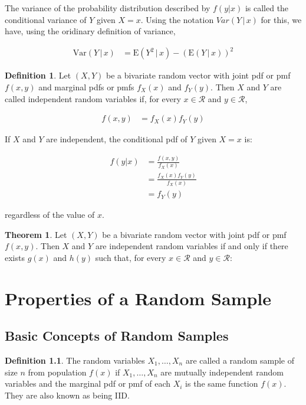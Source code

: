 \documentclass[11pt,a4paper]{report}
\theoremstyle{definition}
\newtheorem{defn}{Definition}[section]
\theoremstyle{theorem}
\newtheorem{thm}{Theorem}[section]
\theoremstyle{example}
\begin{document}
The variance of the probability distribution described by $f(y|x)$ is called the conditional variance of $Y$ given $X = x$.  Using the notation $Var(Y \, | \, x)$ for this, we have, using the oridinary definition of variance,

\begin{align*}
  \mathrm{Var}(Y \, | \, x) &= \mathrm{E}(Y^2 \, | \, x) - (\mathrm{E}(Y \, | \, x))^2
\end{align*}

\begin{defn}
  Let $(X, Y)$ be a bivariate random vector with joint pdf or pmf $f(x,y)$ and marginal pdfs or pmfs $f_X(x)$ and $f_Y(y)$.  Then $X$ and $Y$ are called independent random variables if, for every $x \in \mathcal{R}$ and $y \in \mathcal{R}$,

  \begin{align*}
    f(x,y) &= f_X(x) f_Y(y)
  \end{align*}

  If $X$ and $Y$ are independent, the conditional pdf of $Y$ given $X = x$ is:

  \begin{align*}
    f(y|x) &= \frac{f(x,y)}{f_X(x)} \\
    &= \frac{f_X(x) f_Y(y)}{f_X(x)} \\
    &= f_Y(y)
  \end{align*}

  regardless of the value of $x$.
\end{defn}

\begin{thm}
  Let $(X,Y)$ be a bivariate random vector with joint pdf or pmf $f(x,y)$.  Then $X$ and $Y$ are independent random variables if and only if there exists $g(x)$ and $h(y)$ such that, for every $x \in \mathcal{R}$ and $y \in \mathcal{R}$:
\end{thm}

\chapter{Properties of a Random Sample}

\section{Basic Concepts of Random Samples}

\begin{defn}
  The random variables $X_1, \dots, X_n$ are called a random sample of size $n$ from population $f(x)$ if $X_1, \dots, X_n$ are mutually independent random variables and the marginal pdf or pmf of each $X_i$ is the same function $f(x)$.  They are also known as being IID.
\end{defn}
\end{document}

